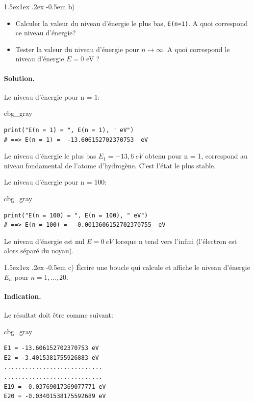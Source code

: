\documentclass[%
oneside,                 %
final,                   %
10pt,french]{article}
\makeatletter
\newenvironment{_cod_tight}[1]{
   \def\FrameCommand{\colorbox{#1}}
   \FrameRule0.6pt\MakeFramed {\FrameRestore}\vskip3mm}
   {\vskip0mm\endMakeFramed}
\newenvironment{cod}[1]{
\bgroup\rmfamily
\fboxsep=0mm\relax
\begin{_cod_tight}{#1}
\list{}{\parsep=-2mm\parskip=0mm\topsep=0pt\leftmargin=2mm
\rightmargin=2\leftmargin\leftmargin=4pt\relax}
\item\relax}
{\endlist\end{_cod_tight}\egroup}
\newenvironment{doconceexercise}{}{}
\newcommand\subex{\@startsection{paragraph}{4}{\z@}%
                  {1.5ex\@plus1ex \@minus.2ex}%
                  {-0.5em}%
                  {\normalfont\normalsize\bfseries}}
\makeatother
\begin{document}
\begin{doconceexercise}
\subex{b)}
\begin{itemize}
\item Calculer la valeur du niveau d'énergie le plus bas, \texttt{E(n=1)}. A quoi correspond ce niveau d'énergie?

\item Tester la valeur du niveau d'énergie pour $n \rightarrow \infty$. A quoi correspond le niveau d'énergie $E = 0$ eV ?
\end{itemize}

\noindent
\paragraph{Solution.}
Le niveau d'énergie pour n = 1:
\begin{cod}{cbg_gray}\begin{verbatim}
print("E(n = 1) = ", E(n = 1), " eV")
# ==> E(n = 1) =  -13.606152702370753  eV
\end{verbatim}
\end{cod}
\noindent
Le niveau d'énergie le plus bas $E_1 = - 13,6 \ eV$ obtenu pour n = 1, correspond au niveau fondamental de l'atome d'hydrogène. C'est l'état le plus stable.

Le niveau d'énergie pour n = 100:
\begin{cod}{cbg_gray}\begin{verbatim}
print("E(n = 100) = ", E(n = 100), " eV")
# ==> E(n = 100) =  -0.0013606152702370755  eV
\end{verbatim}
\end{cod}
\noindent
Le niveau d'énergie est nul $E = 0 \ eV$  lorsque n tend vers l'infini (l'électron est alors séparé du noyau).


\subex{c)}
Écrire une boucle qui calcule et affiche le niveau d'énergie $E_n$ pour $n = 1,…, 20$.


\paragraph{Indication.}
Le résultat doit être comme suivant:
\begin{cod}{cbg_gray}\begin{verbatim}
E1 = -13.606152702370753 eV
E2 = -3.4015381755926883 eV
............................
............................
E19 = -0.03769017369077771 eV
E20 = -0.03401538175592689 eV
\end{verbatim}
\end{cod}
\noindent


\end{doconceexercise}
\end{document}
